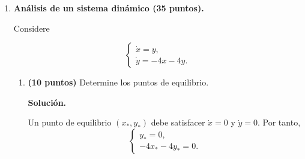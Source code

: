 \documentclass[a4paper,12pt]{article}
\newcommand{\solucion}{
\par\medskip
{\color{solutioncolor}\textbf{Solución.}}
\par
}
\begin{document}
\begin{enumerate}[leftmargin=*,
itemsep=0.8cm]
\begin{enumerate}[label=\alph*),
leftmargin=*,itemsep=0.5cm]
Hemos demostrado la identidad
general

\[
\boxed{
\frac{dE}{dt}=-\mu v^2.
}
\]

En particular, cuando
$\mu=0$,

\[
\boxed{
\frac{dE}{dt}=0.
}
\]

Esto implica que

\[
E(\theta(t),v(t))=E_0,
\]

donde $E_0$ es una constante
determinada por las condiciones
iniciales:

\[
E_0=
\frac12 mv(0)^2+
\kappa(1-\cos\theta(0)).
\]

\textbf{Interpretación física.}

La energía total es la suma
de la energía cinética,

\[
K=\frac12 mv^2,
\]

y la energía potencial,

\[
U=\kappa(1-\cos\theta).
\]

En ausencia de fricción,
la energía puede transformarse
de cinética a potencial y
viceversa, pero su valor total
permanece constante.

Cuando $\mu>0$, en cambio,

\[
\frac{dE}{dt}=-\mu v^2\leq0.
\]

En este caso la energía nunca
aumenta, pues existe disipación
debida a la fricción.

\end{enumerate}

\item \textbf{Análisis de un sistema
dinámico (35 puntos).}

Considere

\begin{equation}
\begin{cases}
\dot x=y,\\
\dot y=-4x-4y.
\end{cases}
\label{eq:sistema}
\end{equation}

\begin{enumerate}[label=\alph*),
leftmargin=*,itemsep=0.5cm]

\item \textbf{(10 puntos)}
Determine los puntos de equilibrio.

\solucion

Un punto de equilibrio $(x_*,y_*)$ debe satisfacer $\dot x=0$ y $\dot y=0$. Por tanto,
\[
\begin{cases}
y_*=0,\\
-4x_*-4y_*=0.
\end{cases}
\]


\end{enumerate}
\end{enumerate}
\end{document}
